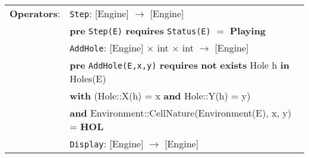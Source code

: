 \documentclass[7pt]{article}
\begin{document}
\begin{tabular}{rl}
\textbf{Operators}: & \texttt{Step}: \textrm{[Engine]} $\rightarrow$ \textrm{[Engine]}\\
& \quad\quad \textbf{pre} \texttt{Step(E)} \textbf{requires} \texttt{Status(E)} $=$ \textbf{Playing} \\
& \texttt{AddHole}: \textrm{[Engine]} $\times$ \textrm{int} $\times$ \textrm{int} $\rightarrow$ \textrm{[Engine]}\\
& \quad\quad \textbf{pre} \texttt{AddHole(E,x,y)} \textbf{requires} \textbf{not} \textbf{exists} Hole h \textbf{in} Holes(E) \\
& \quad\quad\quad\quad \textbf{with} (Hole::X(h) = x \textbf{and} Hole::Y(h) = y) \\ & \quad\quad\quad \textbf{and} Environment::CellNature(Environment(E), x, y) = \textbf{HOL}\\
& \texttt{Display}: \textrm{[Engine]} $\rightarrow$ \textrm{[Engine]}\\


\end{tabular}
\end{document}
